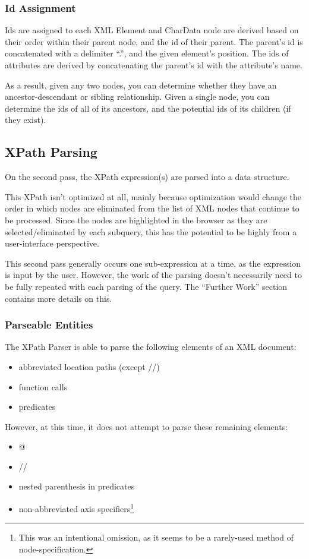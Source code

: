 \documentclass{acm_proc_article-sp}
\begin{document}
\subsubsection{Id Assignment}
Ids are assigned to each XML Element and CharData node are derived based on their order within their parent node, and the id of their parent.  The parent's id is concatenated with a delimiter ``.'', and the given element's  position.   The ids of attributes are derived by concatenating the parent's id with the attribute's name.

As a result, given any two nodes, you can determine whether they have an ancestor-descendant or sibling relationship.  Given a single node, you can determine the ids of all of its ancestors, and the potential ids of its children (if they exist).

\subsection{XPath Parsing}
On the second pass, the XPath expression(s) are parsed into a data structure. 

This XPath isn't optimized at all, mainly because optimization would change the order in which nodes are eliminated from the list of XML nodes that continue to be processed.  Since the nodes are highlighted in the browser as they are selected/eliminated by each subquery, this has the potential to be highly from a user-interface perspective.

This second pass generally occurs one sub-expression at a time, as the expression is input by the user.  However, the work of the parsing doesn't necessarily need to be fully repeated with each parsing of the query. The ``Further Work'' section contains more details on this.

\subsubsection{Parseable Entities}
The XPath Parser is able to parse the following elements of an XML document:
\begin{itemize}
	\item 	abbreviated location paths (except  //)
	\item function calls
	\item predicates
\end{itemize}

However, at this time, it does not attempt to parse these remaining elements:
\begin{itemize}
	\item 	@
	\item 	//
	\item 	 nested parenthesis in predicates
	\item 	non-abbreviated axis specifiers\protect\footnote{This was an intentional omission, as it seems to be a rarely-used method of node-specification.} 
\end{itemize}
\end{document}
